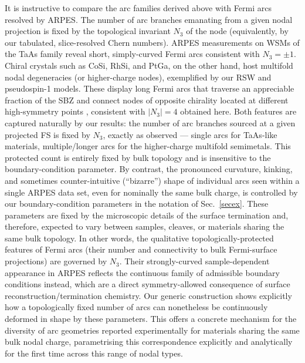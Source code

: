 \documentclass[aps,prb,onecolumn, footinbib, 10pt]{revtex4-2}
\begin{document}
{{It is instructive to compare the arc families derived above with Fermi arcs resolved by ARPES. The number of arc branches emanating from a given nodal projection is fixed by the topological invariant $N_3$ of the node (equivalently, by our tabulated, slice-resolved Chern numbers). ARPES measurements on WSMs of the TaAs family reveal short, simply-curved Fermi arcs consistent with $N_3=\pm1$. Chiral crystals such as CoSi, RhSi, and PtGa, on the other hand, host multifold nodal degeneracies (or higher-charge nodes), exemplified by our RSW and pseudospin-1 models. These display long Fermi arcs that traverse an appreciable fraction of the SBZ and connect nodes of opposite chirality located at different high-symmetry points \cite{takane2019_observation,multifold-rhsi,mengyu}, consistent with $|N_3|=4$ obtained here. Both features are captured naturally by our results: the number of arc branches sourced at a given projected FS is fixed by $N_3$, exactly as observed --- single arcs for TaAs-like materials, multiple/longer arcs for the higher-charge multifold semimetals. This protected count is entirely fixed by bulk topology and is insensitive to the boundary-condition parameter. By contrast, the pronounced curvature, kinking, and sometimes counter-intuitive (``bizarre'') shape of individual arcs seen within a single ARPES data set, even for nominally the same bulk charge, is controlled by our boundary-condition parameters in the notation of Sec.~\ref{secex}. These parameters are fixed by the microscopic details of the surface termination and, therefore, expected to vary between samples, cleaves, or materials sharing the same bulk topology. In other words, the qualitative topologically-protected features of Fermi arcs (their number and connectivity to bulk Fermi-surface projections) are governed by $N_3$. Their strongly-curved sample-dependent appearance in ARPES reflects the continuous family of admissible boundary conditions instead, which are a direct symmetry-allowed consequence of surface reconstruction/termination chemistry. Our generic construction shows explicitly how a topologically fixed number of arcs can nonetheless be continuously deformed in shape by these parameters. This offers a concrete mechanism for the diversity of arc geometries reported experimentally for materials sharing the same bulk nodal charge, parametrising this correspondence explicitly and analytically for the first time across this range of nodal types.

}}
\end{document}

